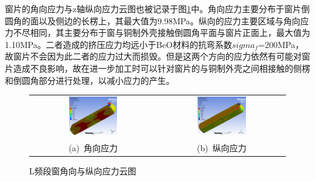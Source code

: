 \documentclass[master]{thesis-uestc}
\begin{document}
窗片的角向应力与z轴纵向应力云图也被记录于图\ref{fig:L频段窗角向纵向应力分布}中。角向应力主要分布于窗片倒圆角的面以及侧边的长楞上，其最大值为9.98MPa。纵向的应力主要区域与角向应力不尽相同，其主要分布于窗与铜制外壳接触倒圆角平面与窗片正面上，最大值为1.10MPa。二者造成的挤压应力均远小于BeO材料的抗弯系数\(sigma_f\)=200MPa，故窗片不会因为此二者的应力过大而损毁。但是这两个方向的应力依然有可能对窗片造成不良影响，故在进一步加工时可以针对窗片的与铜制外壳之间相接触的侧楞和倒圆角部分进行处理，以减小应力的产生。
\begin{figure}[!htb]
    \small
    \centering
    \begin{tabular}{@{\ }c@{\ }c}
        \includegraphics[width=0.4\textwidth]{pic/chapter4/L角向应力.png} & 
        \hspace{5pt}
        \includegraphics[width=0.4\textwidth]{pic/chapter4/L纵向应力.png}     \\
        \mbox{\small (a) 角向应力}                                                                               & 
        \mbox{\small (b) 纵向应力}                                                                                  \\
    \end{tabular}
    \caption{L频段窗角向与纵向应力云图}
    \label{fig:L频段窗角向纵向应力分布}
\end{figure}
\end{document}
